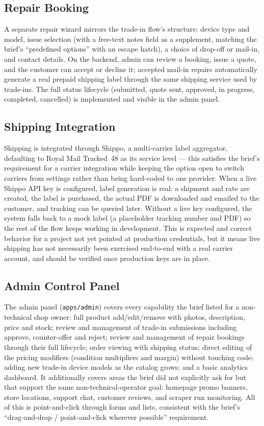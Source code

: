 \documentclass[11pt,a4paper]{article}
\begin{document}
\subsection{Repair Booking}

A separate repair wizard mirrors the trade-in flow's structure: device type and model, issue selection (with a free-text notes field as a supplement, matching the brief's ``predefined options'' with an escape hatch), a choice of drop-off or mail-in, and contact details. On the backend, admin can review a booking, issue a quote, and the customer can accept or decline it; accepted mail-in repairs automatically generate a real prepaid shipping label through the same shipping service used by trade-ins. The full status lifecycle (submitted, quote sent, approved, in progress, completed, cancelled) is implemented and visible in the admin panel.

\subsection{Shipping Integration}

Shipping is integrated through Shippo, a multi-carrier label aggregator, defaulting to Royal Mail Tracked~48 as its service level --- this satisfies the brief's requirement for a carrier integration while keeping the option open to switch carriers from settings rather than being hard-coded to one provider. When a live Shippo API key is configured, label generation is real: a shipment and rate are created, the label is purchased, the actual PDF is downloaded and emailed to the customer, and tracking can be queried later. Without a live key configured, the system falls back to a mock label (a placeholder tracking number and PDF) so the rest of the flow keeps working in development. This is expected and correct behavior for a project not yet pointed at production credentials, but it means live shipping has not necessarily been exercised end-to-end with a real carrier account, and should be verified once production keys are in place.

\subsection{Admin Control Panel}

The admin panel (\texttt{apps/admin}) covers every capability the brief listed for a non-technical shop owner: full product add/edit/remove with photos, description, price and stock; review and management of trade-in submissions including approve, counter-offer and reject; review and management of repair bookings through their full lifecycle; order viewing with shipping status; direct editing of the pricing modifiers (condition multipliers and margin) without touching code; adding new trade-in device models as the catalog grows; and a basic analytics dashboard. It additionally covers areas the brief did not explicitly ask for but that support the same non-technical-operator goal: homepage promo banners, store locations, support chat, customer reviews, and scraper run monitoring. All of this is point-and-click through forms and lists, consistent with the brief's ``drag-and-drop / point-and-click wherever possible'' requirement.
\end{document}
